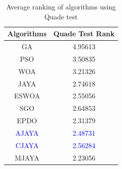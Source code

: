\documentclass[3p,twocolumn]{elsarticle}
\theoremstyle{thmstyleone}%
\theoremstyle{thmstyletwo}%
\theoremstyle{thmstylethree}%
\begin{document}
\begin{table}[btp]
	\caption{Average ranking of algorithms using Quade test}
	\label{Quade}
	\centering
	\begin{tabular}{@{}cc@{}}
		\toprule
		\textbf{Algorithms} & \textbf{Quade Test Rank} \\ \midrule
		GA                  & 4.95613                   \\
		PSO                 & 3.50835                  \\
		WOA                 & 3.21326              \\
		JAYA                & 2.74618              \\
		ESWOA               & 2.55056              \\
        SGO                 & 2.64853              \\
       EPDO    & 2.31379 \\
        \textcolor{blue}{AJAYA} & \textcolor{blue}{2.48731} \\
        \textcolor{blue}{CJAYA} & \textcolor{blue}{2.56284} \\
        MJAYA   & 2.23056 \\ \bottomrule
	\end{tabular}
\end{table}
\end{document}
